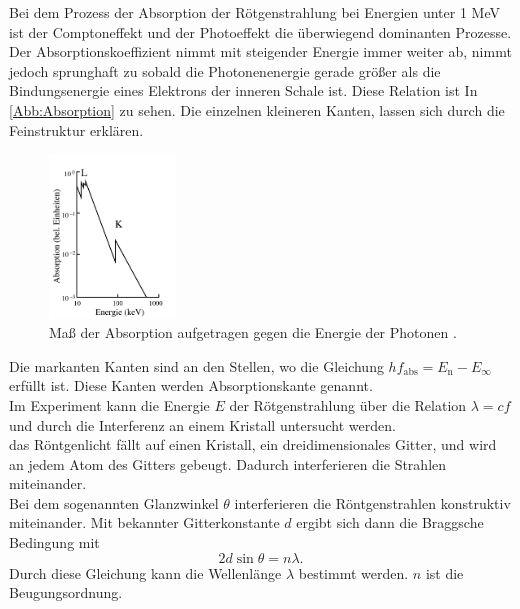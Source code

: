Bei dem Prozess der Absorption der Rötgenstrahlung bei Energien unter
1 MeV ist der Comptoneffekt und der Photoeffekt die überwiegend dominanten
Prozesse.\\
Der Absorptionskoeffizient nimmt mit steigender Energie immer weiter ab,
nimmt jedoch sprunghaft zu sobald die Photonenenergie gerade größer als die
Bindungsenergie eines Elektrons der inneren Schale ist. Diese Relation ist In
\autoref{Abb:Absorption} zu sehen. Die einzelnen kleineren Kanten, lassen
sich durch die Feinstruktur erklären.\\
\begin{figure}
    \centering
    \includegraphics[width=0.3\textwidth]{Bilder/Absorption.png}
    \caption{Maß der Absorption aufgetragen gegen die Energie der Photonen \cite{sample}.}
    \label{Abb:Absorption}
\end{figure}
Die markanten Kanten sind an den Stellen, wo die Gleichung $h f_{\mathrm{abs}} = E_{\mathrm{n}} - E_{\infty}$
erfüllt ist. Diese Kanten werden Absorptionskante genannt.\\
Im Experiment kann die Energie $E$ der Rötgenstrahlung über die Relation $\lambda = cf$ und
durch die Interferenz an einem Kristall untersucht werden.\\
das Röntgenlicht fällt auf einen Kristall, ein dreidimensionales Gitter,
und wird an jedem Atom des Gitters gebeugt. Dadurch interferieren die 
Strahlen miteinander.\\
Bei dem sogenannten Glanzwinkel $\theta$ interferieren die Röntgenstrahlen konstruktiv
miteinander. Mit bekannter Gitterkonstante $d$ ergibt sich dann die Braggsche Bedingung mit
\begin{equation}
    2d \sin{\theta} = n \lambda.
\end{equation}
Durch diese Gleichung kann die Wellenlänge $\lambda$ bestimmt werden. $n$ ist 
die Beugungsordnung.\\
